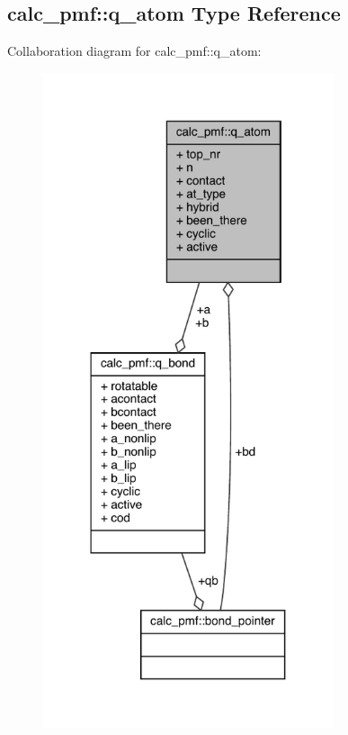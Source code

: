 \hypertarget{structcalc__pmf_1_1q__atom}{\subsection{calc\-\_\-pmf\-:\-:q\-\_\-atom Type Reference}
\label{structcalc__pmf_1_1q__atom}
}


Collaboration diagram for calc\-\_\-pmf\-:\-:q\-\_\-atom\-:
\nopagebreak
\begin{figure}[H]
\begin{center}
\leavevmode
\includegraphics[width=242pt]{structcalc__pmf_1_1q__atom__coll__graph}
\end{center}
\end{figure}
